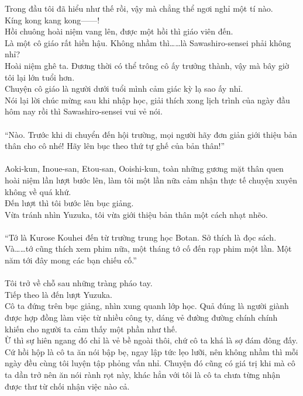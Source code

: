\documentclass[12pt,a4paper, twosides]{book}
\begin{document}
Trong đầu tôi đã hiểu như thế rồi, vậy mà chẳng thể ngơi nghỉ một tí nào.\\
Kíng kong kang kong——!\\
Hồi chuông hoài niệm vang lên, được một hồi thì giáo viên đến.\\
Là một cô giáo rất hiền hậu. Không nhầm thì……là Sawashiro-sensei phải không nhỉ?\\
Hoài niệm ghê ta. Đương thời có thể trông cô ấy trưởng thành, vậy mà bây giờ tôi lại lớn tuổi hơn.\\
Chuyện cô giáo là người dưới tuổi mình cảm giác kỳ lạ sao ấy nhỉ.\\
Nói lại lời chúc mừng sau khi nhập học, giải thích xong lịch trình của ngày đầu hôm nay rồi thì Sawashiro-sensei vui vẻ nói.\\
\\
“Nào. Trước khi di chuyển đến hội trường, mọi người hãy đơn giản giới thiệu bản thân cho cô nhé! Hãy lên bục theo thứ tự ghế của bản thân!”\\
\\
Aoki-kun, Inoue-san, Etou-san, Ooishi-kun, toàn những gương mặt thân quen hoài niệm lần lượt bước lên, làm tôi một lần nữa cảm nhận thực tế chuyện xuyên không về quá khứ.\\
Đến lượt thì tôi bước lên bục giảng.\\
Vừa tránh nhìn Yuzuka, tôi vừa giới thiệu bản thân một cách nhạt nhẽo.\\
\\
“Tớ là Kurose Kouhei đến từ trường trung học Botan. Sở thích là đọc sách. Và……tớ cũng thích xem phim nữa, một tháng tớ cố đến rạp phim một lần. Một năm tới đây mong các bạn chiếu cố.”\\
\\
Tôi trở về chỗ sau những tràng pháo tay.\\
Tiếp theo là đến lượt Yuzuka.\\
Cô ta đứng trên bục giảng, nhìn xung quanh lớp học. Quả đúng là người giành được hợp đồng làm việc từ nhiều công ty, dáng vẻ đường đường chính chính khiến cho người ta cảm thấy một phần như thế.\\
Ừ thì sự hiên ngang đó chỉ là vẻ bề ngoài thôi, chứ cô ta khá là sợ đám đông đấy.\\
Cứ hồi hộp là cô ta ăn nói bập bẹ, ngay lập tức lẹo lưỡi, nên không nhầm thì mỗi ngày đều cùng tôi luyện tập phỏng vấn nhỉ. Chuyện đó cũng có giá trị khi mà cô ta dần trở nên ăn nói rành rọt này, khác hẳn với tôi là cô ta chưa từng nhận được thư từ chối nhận việc nào cả.\\
\end{document}
